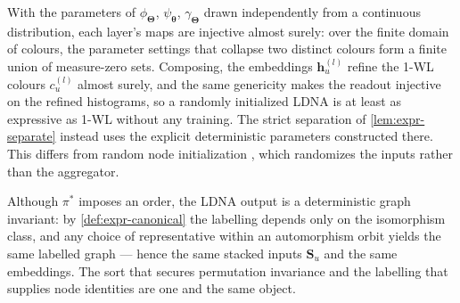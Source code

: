 \begin{remark}
\label{rem:expr-random-init}
With the parameters of $\phi_{\bm{\Theta}}$, $\psi_{\bm{\theta}}$,
$\gamma_{\bm{\Theta}}$ drawn independently from a continuous distribution, each
layer's maps are injective almost surely: over the finite domain of colours, the
parameter settings that collapse two distinct colours form a finite union of
measure-zero sets. Composing, the embeddings $\mathbf{h}_u^{(l)}$ refine the 1-WL
colours $c_u^{(l)}$ almost surely, and the same genericity makes the readout
injective on the refined histograms, so a randomly initialized LDNA is at least
as expressive as 1-WL without any training. The strict separation of
\cref{lem:expr-separate} instead uses the explicit deterministic parameters
constructed there. This differs from random node initialization
\citep{Abboud2021RNI}, which randomizes the inputs rather than the aggregator.
\end{remark}

\begin{remark}
\label{rem:expr-invariance}
Although $\pi^*$ imposes an order, the LDNA output is a deterministic graph
invariant: by \cref{def:expr-canonical} the labelling depends only on the
isomorphism class, and any choice of representative within an automorphism orbit
yields the same labelled graph --- hence the same stacked inputs $\mathbf{S}_u$
and the same embeddings. The sort that secures permutation invariance and the
labelling that supplies node identities are one and the same object.
\end{remark}
